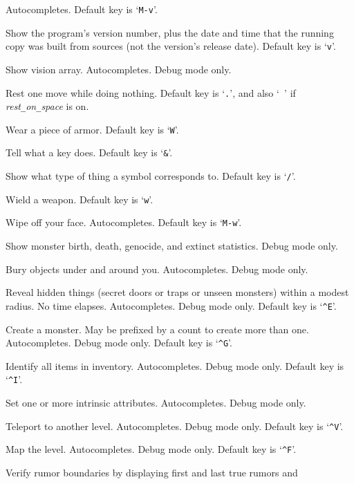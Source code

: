 Autocompletes. Default key is `{\tt M-v}'.
\item[\tb{\#versionshort}]
Show the program's version number, plus the date and time that the
running copy was built from sources (not the version's release date).
Default key is `{\tt v}'.
\item[\tb{\#vision}]
Show vision array.
Autocompletes.
Debug mode only.
\item[\tb{\#wait}]
Rest one move while doing nothing.
Default key is `{\tt .}', and also `{\tt{ }}' if
{\it rest\verb+_+on\verb+_+space\/} is on.
\item[\tb{\#wear}]
Wear a piece of armor. Default key is `{\tt W}'.
\item[\tb{\#whatdoes}]
Tell what a key does. Default key is `{\tt \&}'.
\item[\tb{\#whatis}]
Show what type of thing a symbol corresponds to. Default key is `{\tt /}'.
\item[\tb{\#wield}]
Wield a weapon. Default key is `{\tt w}'.
\item[\tb{\#wipe}]
Wipe off your face. Autocompletes. Default key is `{\tt M-w}'.
\item[\tb{\#wizborn}]
Show monster birth, death, genocide, and extinct statistics.
Debug mode only.
\item[\tb{\#wizbury}]
Bury objects under and around you.
Autocompletes.
Debug mode only.
\item[\tb{\#wizdetect}]
Reveal hidden things (secret doors or traps or unseen monsters)
within a modest radius.
No time elapses.
Autocompletes.
Debug mode only.
Default key is `{\tt \^{}E}'.
\item[\tb{\#wizgenesis}]
Create a monster.
May be prefixed by a count to create more than one.
Autocompletes.
Debug mode only.
Default key is `{\tt \^{}G}'.
\item[\tb{\#wizidentify}]
Identify all items in inventory.
Autocompletes.
Debug mode only.
Default key is `{\tt \^{}I}'.
\item[\tb{\#wizintrinsic}]
Set one or more intrinsic attributes.
Autocompletes.
Debug mode only.
\item[\tb{\#wizlevelport}]
Teleport to another level.
Autocompletes.
Debug mode only.
Default key is `{\tt \^{}V}'.
\item[\tb{\#wizmap}]
Map the level.
Autocompletes.
Debug mode only.
Default key is `{\tt \^{}F}'.
\item[\tb{\#wizrumorcheck}]
Verify rumor boundaries by displaying first and last true rumors and
